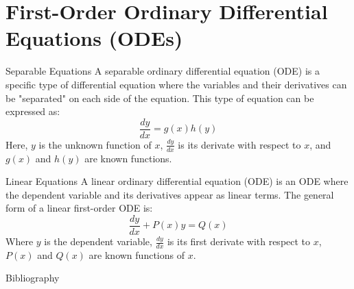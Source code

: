 \documentclass[aspectratio=169]{beamer}
\begin{document}
	\section{First-Order Ordinary Differential Equations (ODEs)}
        \begin{frame}{Separable Equations}
            A separable ordinary differential equation (ODE) is a specific type 
            of differential equation where the variables and their derivatives 
            can be "separated" on each side of the equation.
            This type of equation can be expressed as:
            	\begin{equation}
            		\dfrac{dy}{dx} = g(x)h(y)
            	\end{equation}
            Here, $y$ is the unknown function of $x$, $\frac{dy}{dx}$ is its derivate with respect to $x$, 
            and $g(x)$ and $h(y)$ are known functions.
        \end{frame}
		\begin{frame}{Linear Equations}
			A linear ordinary differential equation (ODE) is an ODE where the dependent variable and 
			its derivatives appear as linear terms.
			The general form of a linear first-order ODE is:
				\begin{equation}
					\dfrac{dy}{dx} + P(x)y = Q(x)
				\end{equation}
			Where $y$ is the dependent variable, $\frac{dy}{dx}$ is its first derivate with respect to $x$, 
			$P(x)$ and $Q(x)$ are known functions of $x$.
		\end{frame}
    \begin{frame}[t,allowframebreaks]{Bibliography}
		 
		 	
		 		\nocite{zill-2012}
	\end{frame}
	\begin{frame}[t]
		\maketitle
	\end{frame}
\end{document}
